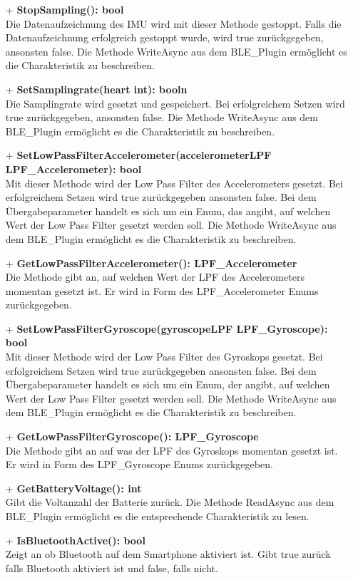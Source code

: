 \documentclass[a4paper,12pt]{article}
\begin{document}
\begin{itemize}
	\item[+] \textbf{StopSampling(): bool}\\Die Datenaufzeichnung des IMU wird mit dieser Methode gestoppt. Falls die Datenaufzeichnung erfolgreich gestoppt wurde, wird true zurückgegeben, ansonsten false. Die Methode WriteAsync aus dem BLE\_Plugin ermöglicht es die Charakteristik zu beschreiben.
	\item[+] \textbf{SetSamplingrate(heart int): booln}\\Die Samplingrate wird gesetzt und gespeichert. Bei erfolgreichem Setzen wird true zurückgegeben, ansonsten false. Die Methode WriteAsync aus dem BLE\_Plugin ermöglicht es die Charakteristik zu beschreiben.
	\item[+] \textbf{SetLowPassFilterAccelerometer(accelerometerLPF LPF\_Accelerometer): bool}\\ Mit dieser Methode wird der Low Pass Filter des Accelerometers gesetzt. Bei erfolgreichem Setzen wird true zurückgegeben ansonsten false. Bei dem Übergabeparameter handelt es sich um ein Enum, das angibt, auf welchen Wert der Low Pass Filter gesetzt werden soll. Die Methode WriteAsync aus dem BLE\_Plugin ermöglicht es die Charakteristik zu beschreiben.
	\item[+] \textbf{GetLowPassFilterAccelerometer(): LPF\_Accelerometer}\\ Die Methode gibt an, auf welchen Wert der LPF des Accelerometers momentan gesetzt ist. Er wird in Form des LPF\_Accelerometer Enums zurückgegeben. 
	\item[+] \textbf{SetLowPassFilterGyroscope(gyroscopeLPF LPF\_Gyroscope): bool}\\ Mit dieser Methode wird der Low Pass Filter des Gyroskops gesetzt. Bei erfolgreichem Setzen wird true zurückgegeben ansonsten false. Bei dem Übergabeparameter handelt es sich um ein Enum, der angibt, auf welchen Wert der Low Pass Filter gesetzt werden soll. Die Methode WriteAsync aus dem BLE\_Plugin ermöglicht es die Charakteristik zu beschreiben.
	\item[+] \textbf{GetLowPassFilterGyroscope(): LPF\_Gyroscope}\\Die Methode gibt an auf was der LPF des Gyroskops momentan gesetzt ist. Er wird in Form des LPF\_Gyroscope Enums zurückgegeben. 
	\item[+] \textbf{GetBatteryVoltage(): int}\\ Gibt die Voltanzahl der Batterie zurück. Die Methode ReadAsync aus dem BLE\_Plugin ermöglicht es die entsprechende Charakteristik zu lesen.
	\item[+] \textbf{IsBluetoothActive(): bool}\\ Zeigt an ob Bluetooth auf dem Smartphone aktiviert ist. Gibt true zurück falls Bluetooth aktiviert ist und false, falls nicht.

\end{itemize}
\end{document}
